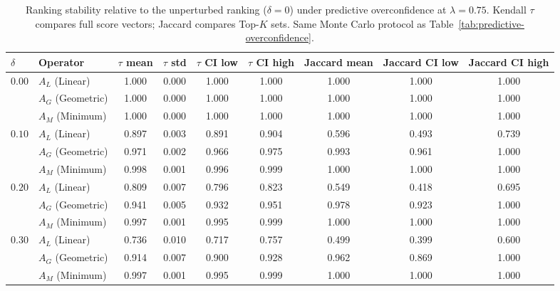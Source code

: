 \begin{table}[H]
\caption{Ranking stability relative to the unperturbed ranking ($\delta=0$) under predictive overconfidence at $\lambda=0.75$. Kendall $\tau$ compares full score vectors; Jaccard compares Top-$K$ sets. Same Monte Carlo protocol as Table~\ref{tab:predictive-overconfidence}.}
\label{tab:overconfidence-kendall}
\centering
\small
\renewcommand{\arraystretch}{1.2}
\begin{tabular}{llccccccc}
\toprule
$\delta$ & Operator & $\tau$ mean & $\tau$ std & $\tau$ CI low & $\tau$ CI high & Jaccard mean & Jaccard CI low & Jaccard CI high \\
\midrule
\multirow{3}{*}{$0.00$} & $A_L$ (Linear) & 1.000 & 0.000 & 1.000 & 1.000 & 1.000 & 1.000 & 1.000 \\
 & $A_G$ (Geometric) & 1.000 & 0.000 & 1.000 & 1.000 & 1.000 & 1.000 & 1.000 \\
 & $A_M$ (Minimum) & 1.000 & 0.000 & 1.000 & 1.000 & 1.000 & 1.000 & 1.000 \\
\midrule
\multirow{3}{*}{$0.10$} & $A_L$ (Linear) & 0.897 & 0.003 & 0.891 & 0.904 & 0.596 & 0.493 & 0.739 \\
 & $A_G$ (Geometric) & 0.971 & 0.002 & 0.966 & 0.975 & 0.993 & 0.961 & 1.000 \\
 & $A_M$ (Minimum) & 0.998 & 0.001 & 0.996 & 0.999 & 1.000 & 1.000 & 1.000 \\
\midrule
\multirow{3}{*}{$0.20$} & $A_L$ (Linear) & 0.809 & 0.007 & 0.796 & 0.823 & 0.549 & 0.418 & 0.695 \\
 & $A_G$ (Geometric) & 0.941 & 0.005 & 0.932 & 0.951 & 0.978 & 0.923 & 1.000 \\
 & $A_M$ (Minimum) & 0.997 & 0.001 & 0.995 & 0.999 & 1.000 & 1.000 & 1.000 \\
\midrule
\multirow{3}{*}{$0.30$} & $A_L$ (Linear) & 0.736 & 0.010 & 0.717 & 0.757 & 0.499 & 0.399 & 0.600 \\
 & $A_G$ (Geometric) & 0.914 & 0.007 & 0.900 & 0.928 & 0.962 & 0.869 & 1.000 \\
 & $A_M$ (Minimum) & 0.997 & 0.001 & 0.995 & 0.999 & 1.000 & 1.000 & 1.000 \\
\bottomrule
\end{tabular}
\end{table}
